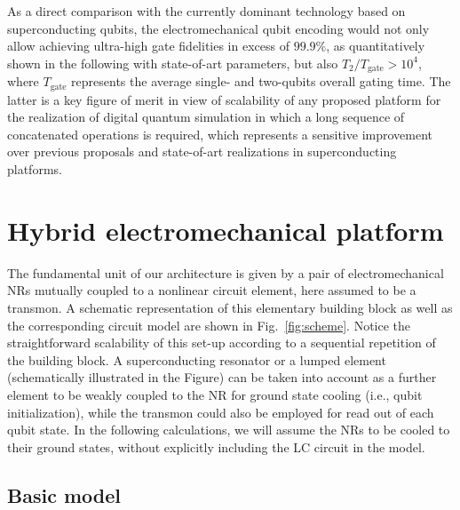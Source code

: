 \documentclass[aps,twocolumn,groupedaddress,superscriptaddress,floatfix,amsmath,amssymb,prb]{revtex4-1}
\begin{document}
{As a direct comparison with the currently dominant technology based on superconducting qubits, the electromechanical qubit encoding would not only allow achieving ultra-high gate fidelities in excess of $99.9\%$, as quantitatively shown in the following with state-of-art parameters, but also $T_2 / T_{\mathrm{gate}} > 10^4$, where $T_{\mathrm{gate}}$ represents the average single- and two-qubits overall gating time. The latter is a key figure of merit in view of scalability of any proposed platform for the realization of digital quantum simulation in which a long sequence of concatenated operations is required, which represents a sensitive improvement over previous proposals \cite{LasHeras2014,Mezzacapo2014,Chiesa2015} and state-of-art realizations \cite{Barends2014,Abdi2015,Barends2015,Salathe2015} in superconducting platforms.
}     


\section{Hybrid electromechanical platform} 

The fundamental unit of our architecture is given by a pair of electromechanical NRs mutually coupled to a nonlinear circuit element, here assumed to be a transmon. A schematic representation of this elementary building block as well as the corresponding circuit model are shown in Fig.\ \ref{fig:scheme}. Notice the straightforward scalability of this set-up according to a sequential repetition of the building block. A superconducting resonator or a lumped element (schematically illustrated in the Figure) can be taken into account as a further element to be weakly coupled to the NR for ground state cooling \cite{Teufel2011} (i.e., qubit initialization), while the transmon could also be employed for read out of each qubit state. In the following calculations, we will assume the NRs to be cooled to their ground states, without explicitly including the LC circuit in the model. 


\subsection{Basic model}
\end{document}
